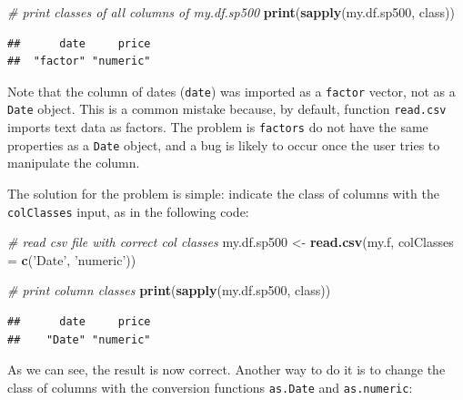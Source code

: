 \documentclass[11pt,]{book}
\newenvironment{Shaded}{\begin{snugshade}}{\end{snugshade}}
\newcommand{\KeywordTok}[1]{\textcolor[rgb]{0.27,0.27,0.27}{\textbf{#1}}}
\newcommand{\DataTypeTok}[1]{\textcolor[rgb]{0.27,0.27,0.27}{#1}}
\newcommand{\StringTok}[1]{\textcolor[rgb]{0.5,0.5,0.5}{#1}}
\newcommand{\CommentTok}[1]{\textcolor[rgb]{0.56,0.35,0.01}{\textit{#1}}}
\newcommand{\OperatorTok}[1]{\textcolor[rgb]{0.81,0.36,0.00}{\textbf{#1}}}
\newcommand{\NormalTok}[1]{#1}
\begin{document}
\begin{Shaded}
\begin{Highlighting}[]
\CommentTok{# print classes of all columns of my.df.sp500}
\KeywordTok{print}\NormalTok{(}\KeywordTok{sapply}\NormalTok{(my.df.sp500, class))}
\end{Highlighting}
\end{Shaded}

\begin{verbatim}
##      date     price 
##  "factor" "numeric"
\end{verbatim}

Note that the column of dates (\texttt{date}) was imported as a
\texttt{factor} vector, not as a \texttt{Date} object. This is a common
mistake because, by default, function \texttt{read.csv} imports text
data as factors. The problem is \texttt{factors} do not have the same
properties as a \texttt{Date} object, and a bug is likely to occur once
the user tries to manipulate the column.

The solution for the problem is simple: indicate the class of columns
with the \texttt{colClasses} input, as in the following code:

\begin{Shaded}
\begin{Highlighting}[]
\CommentTok{# read csv file with correct col classes}
\NormalTok{my.df.sp500 <-}\StringTok{ }\KeywordTok{read.csv}\NormalTok{(my.f,  }\DataTypeTok{colClasses =} \KeywordTok{c}\NormalTok{(}\StringTok{'Date'}\NormalTok{, }\StringTok{'numeric'}\NormalTok{))}

\CommentTok{# print column classes}
\KeywordTok{print}\NormalTok{(}\KeywordTok{sapply}\NormalTok{(my.df.sp500, class))}
\end{Highlighting}
\end{Shaded}

\begin{verbatim}
##      date     price 
##    "Date" "numeric"
\end{verbatim}

As we can see, the result is now correct. Another way to do it is to
change the class of columns with the conversion functions
\texttt{as.Date} and \texttt{as.numeric}: 

\begin{Shaded}
\end{Shaded}
\end{document}
